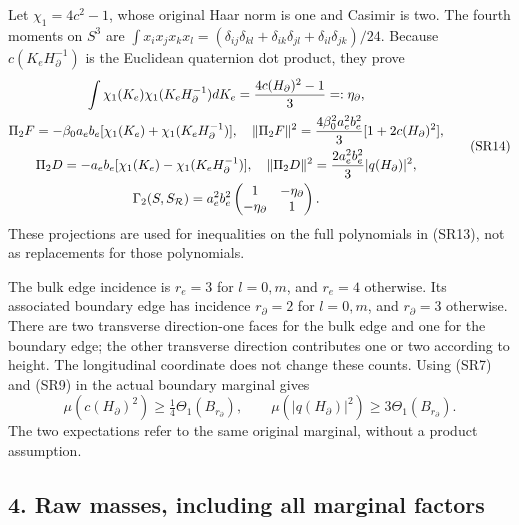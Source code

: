 \documentclass[11pt]{article}
\begin{document}
Let \(\chi_1=4c^2-1\), whose original Haar norm is one and Casimir is two. The fourth moments on \(S^3\) are
\(\int x_ix_jx_kx_l=(\delta_{ij}\delta_{kl}+\delta_{ik}\delta_{jl}+\delta_{il}\delta_{jk})/24\).
Because \(c(K_eH_\partial^{-1})\) is the Euclidean quaternion dot product, they prove
\[
\begin{gathered}
\int\chi_1(K_e)\chi_1(K_eH_\partial^{-1})dK_e={4c(H_\partial)^2-1\over3}=:\eta_\partial,\\
\Pi_2F=-\beta_0a_eb_e[\chi_1(K_e)+\chi_1(K_eH_\partial^{-1})],\quad
\|\Pi_2F\|^2={4\beta_0^2a_e^2b_e^2\over3}[1+2c(H_\partial)^2],\\
\Pi_2D=-a_eb_e[\chi_1(K_e)-\chi_1(K_eH_\partial^{-1})],\quad
\|\Pi_2D\|^2={2a_e^2b_e^2\over3}|q(H_\partial)|^2,\\
\Gamma_2(S,S_{\mathcal R})=a_e^2b_e^2
\begin{pmatrix}1&-\eta_\partial\\-\eta_\partial&1\end{pmatrix}.
\end{gathered}\tag{SR14}
\]
These projections are used for inequalities on the full polynomials in (SR13), not as replacements for those polynomials.

The bulk edge incidence is \(r_e=3\) for \(l=0,m\), and \(r_e=4\) otherwise. Its associated boundary edge has incidence \(r_\partial=2\) for \(l=0,m\), and \(r_\partial=3\) otherwise. There are two transverse direction-one faces for the bulk edge and one for the boundary edge; the other transverse direction contributes one or two according to height. The longitudinal coordinate does not change these counts. Using (SR7) and (SR9) in the actual boundary marginal gives
\[
\mu(c(H_\partial)^2)\ge\tfrac14\Theta_1(B_{r_\partial}),
\qquad\mu(|q(H_\partial)|^2)\ge3\Theta_1(B_{r_\partial}).
\tag{SR15}
\]
The two expectations refer to the same original marginal, without a product assumption.

\subsection*{4. Raw masses, including all marginal factors}
\end{document}
